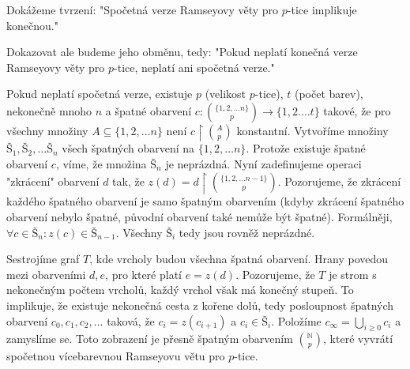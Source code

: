 \begin{t_proof}
  Dokážeme tvrzení: "Spočetná verze Ramseyovy věty pro $p$-tice implikuje konečnou."  
  
  Dokazovat ale budeme jeho obměnu, tedy: "Pokud neplatí konečná verze Ramseyovy věty pro $p$-tice, neplatí ani spočetná verze."

  Pokud neplatí spočetná verze, existuje $p$ (velikost $p$-tice), $t$ (počet barev), nekonečně mnoho $n$ a špatné obarvení $c:\binom{\{1,2,\dots n\}}{p}\rightarrow \{1,2.\dots t\}$ takové, že pro všechny množiny $A\subseteq\{1,2,\dots n\}$ není $c\restriction\binom{A}{p}$ konstantní. Vytvoříme množiny $Š_1, Š_2,\dots Š_n$ všech špatných obarvení na $\{1,2,\dots n\}$. Protože existuje špatné obarvení $c$, víme, že množina $Š_n$ je neprázdná. Nyní zadefinujeme operaci "zkrácení" obarvení $d$ tak, že $z(d)=d\restriction\binom{\{1,2,\dots n-1\}}{p}$. Pozorujeme, že zkrácení každého špatného obarvení je samo špatným obarvením (kdyby zkrácení špatného obarvení nebylo špatné, původní obarvení také nemůže být špatné). Formálněji, $\forall c\in Š_n:z(c)\in Š_{n-1}$. Všechny $Š_i$ tedy jsou rovněž neprázdné.

  Sestrojíme graf $T$, kde vrcholy budou všechna špatná obarvení. Hrany povedou mezi obarveními $d,e$, pro které platí $e=z(d)$. Pozorujeme, že $T$ je strom s nekonečným počtem vrcholů, každý vrchol však má konečný stupeň. To implikuje, že existuje nekonečná cesta z kořene dolů, tedy posloupnost špatných obarvení $c_0,c_1,c_2,\dots$ taková, že $c_i=z(c_{i+1})$ a $c_i\in Š_i$. Položíme $c_\infty=\bigcup_{i\geq 0} c_i$ a zamyslíme se. Toto zobrazení je přesně špatným obarvením $\binom{\mathbb{N}}{p}$, které vyvrátí spočetnou vícebarevnou Ramseyovu větu pro $p$-tice.
\end{t_proof}
